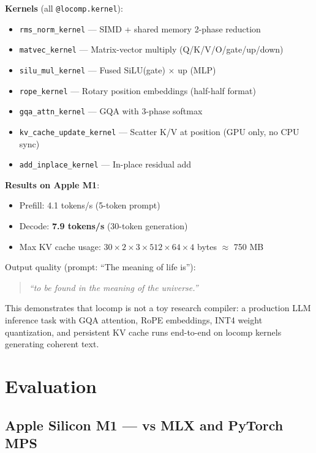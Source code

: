 \documentclass[10pt,twocolumn]{article}
\begin{document}
\textbf{Kernels} (all \texttt{@locomp.kernel}):
\begin{itemize}[noitemsep]
  \item \texttt{rms\_norm\_kernel} --- SIMD + shared memory 2-phase reduction
  \item \texttt{matvec\_kernel} --- Matrix-vector multiply (Q/K/V/O/gate/up/down)
  \item \texttt{silu\_mul\_kernel} --- Fused SiLU(gate) $\times$ up (MLP)
  \item \texttt{rope\_kernel} --- Rotary position embeddings (half-half format)
  \item \texttt{gqa\_attn\_kernel} --- GQA with 3-phase softmax
  \item \texttt{kv\_cache\_update\_kernel} --- Scatter K/V at position (GPU only, no CPU sync)
  \item \texttt{add\_inplace\_kernel} --- In-place residual add
\end{itemize}

\textbf{Results on Apple M1}:
\begin{itemize}[noitemsep]
  \item Prefill: 4.1 tokens/s (5-token prompt)
  \item Decode: \textbf{7.9 tokens/s} (30-token generation)
  \item Max KV cache usage: $30 \times 2 \times 3 \times 512 \times 64 \times 4$ bytes $\approx$ 750 MB
\end{itemize}

Output quality (prompt: ``The meaning of life is''):
\begin{quote}
\textit{``to be found in the meaning of the universe.''}
\end{quote}

This demonstrates that locomp is not a toy research compiler: a production LLM
inference task with GQA attention, RoPE embeddings, INT4 weight quantization,
and persistent KV cache runs end-to-end on locomp kernels generating coherent text.

\section{Evaluation}
\label{sec:eval}

\subsection{Apple Silicon M1 --- vs MLX and PyTorch MPS}
\end{document}
